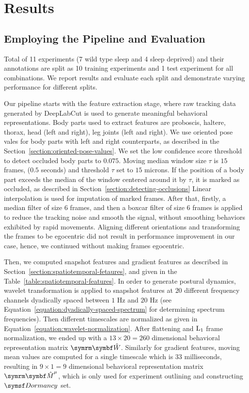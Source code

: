 \chapter{Results}

\section{Employing the Pipeline and  Evaluation}\label{section:employing-proposed-pipeline}
Total of 11 experiments (7 wild type sleep and 4 sleep deprived) and their annotations are split as 10 training experiments and 1 test experiment for all combinations.
We report results and evaluate each split and demonstrate varying performance for different splits.

Our pipeline starts with the feature extraction stage, where raw tracking data generated by DeepLabCut is used to generate meaningful behavioral representations.
Body parts used to extract features are proboscis, haltere, thorax, head (left and right), leg joints (left and right).
We use oriented pose vales for body parts with left and right counterparts, as described in the Section~\ref{section:oriented-pose-values}.
We set the low confidence score threshold to detect occluded body parts to $0.075$.
Moving median window size $\tau$ is $15$ frames, ($0.5$ seconds) and threshold $\tau$ set to $15$ microns. If the position of a body part exceeds the median of the window centered around it by $\tau$, it is marked as occluded, as described in Section~\ref{section:detecting-occlusions}
Linear interpolation is used for imputation of marked frames.
After that, firstly, a median filter of size $6$ frames, and then a boxcar filter of size $6$ frames is applied to reduce the tracking noise and smooth the signal, without smoothing behaviors exhibited by rapid movements.
Aligning different orientations and transforming the frames to be egocentric did not result in performance improvement in our case, hence, we continued without making frames egocentric.

Then, we computed snapshot features and gradient features as described in Section~\ref{section:spatiotemporal-fetaures}, and given in the Table~\ref{table:spatiotemporal-features}.
In order to generate postural dynamics, wavelet transformation is applied to snapshot features at $20$ different frequency channels dyadically spaced between $1$ Hz and $20$ Hz (see Equation~\ref{equation:dyadically-spaced-spectrum} for determining spectrum frequencies).
Then different timescales are normalized as given in Equation~\ref{equation:wavelet-normalization}.
After flattening and $\textnormal{L}_1$ frame normalization, we ended up with a $13 \times 20 = 260$ dimensional behavioral representation matrix $\V{\hat{W}}$.
Similarly for gradient features, moving mean values are computed for a single timescale which is $33$ milliseconds, resulting in $9 \times 1 = 9$ dimensional behavioral representation matrix $\V{\hat{M}}^\mu$, which is only used for experiment outlining and constructing $\Dormancy$ set.


